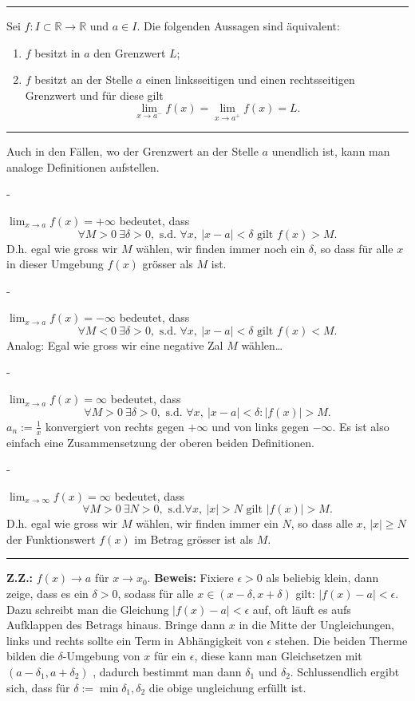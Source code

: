 \documentclass[a4paper,landscape,8pt]{extarticle}
\newcommand{\R}{\mathbb{R}}
\newcommand{\abs}[1]{\left\lvert #1 \right\rvert}
\newcommand{\sep}{\vspace{5pt}\noindent\hrule\vspace{5pt}}
\newcommand{\ZZ}{\textbf{Z.Z.: }}
\newcommand{\Beweis}{\textbf{Beweis: }}
\begin{document}
\begin{multicols*}{4}
\sep

\Satz Sei $f\colon I\subset\R\to\R$ und $a\in I$. Die folgenden Aussagen sind
äquivalent:
\begin{enumerate}[label=\roman*)]
  \item $f$ besitzt in $a$ den Grenzwert $L$;
  \item $f$ besitzt an der Stelle $a$ einen linksseitigen und einen
  rechtsseitigen Grenzwert und für diese gilt
  \[
  \lim_{x\to a^-} f(x) = \lim_{x\to a^+} f(x) = L.
  \]
\end{enumerate}

\sep

Auch in den Fällen, wo der Grenzwert an der Stelle $a$ unendlich ist, kann man
analoge Definitionen aufstellen.

-

\Def $\lim_{x\to a} f(x)= + \infty$ bedeutet, dass
\[
\forall M>0 \ \exists\delta > 0, \text{ s.d. } \forall x, \ \abs{x-a}<\delta
\text{ gilt } f(x) > M. 
\]
D.h. egal wie gross wir $M$ wählen, wir finden immer noch ein $\delta$, so dass
für alle $x$ in dieser Umgebung $f(x)$ grösser als $M$ ist.

-

\Def $\lim_{x\to a} f(x)= - \infty$ bedeutet, dass
\[
\forall M<0 \ \exists\delta > 0, \text{ s.d. } \forall x, \ \abs{x-a}<\delta
\text{ gilt } f(x) < M. 
\]
Analog: Egal wie gross wir eine negative Zal $M$ wählen\ldots

-

\Def $\lim_{x\to a} f(x)= \infty$ bedeutet, dass
\[
\forall M>0 \ \exists\delta > 0, \text{ s.d. } \forall x, \ \abs{x-a}<\delta
\colon \abs{f(x)} > M. 
\]
\Bsp $a_n:=\frac{1}{x}$ konvergiert von rechts gegen $+\infty$ und von links
gegen $-\infty$. Es ist also einfach eine Zusammensetzung der oberen beiden
Definitionen.

-

\Def $\lim_{x\to \infty} f(x)= \infty$ bedeutet, dass
\[
\forall M>0 \ \exists N > 0, \text{ s.d.} \forall x, \ \abs{x}>N
\text{ gilt } \abs{f(x)} > M. 
\]
D.h. egal wie gross wir $M$ wählen, wir finden immer ein $N$, so dass alle $x$,
$\abs{x}\geq N$ der Funktionswert $f(x)$ im Betrag grösser ist als $M$.

\sep


\ZZ $f(x)\to a$ für $x\to x_0$. \Beweis Fixiere $\epsilon >0$ als beliebig
klein, dann zeige, dass es ein $\delta > 0$, sodass für alle
$x\in(x-\delta,x+\delta)$ gilt:
$\abs{f(x)-a}<\epsilon$. Dazu schreibt man die Gleichung $\abs{f(x)-a}<\epsilon$
auf, oft läuft es aufs Aufklappen des Betrags hinaus.
Bringe dann $x$ in die Mitte der Ungleichungen, links und rechts sollte ein Term
in Abhängigkeit von $\epsilon$ stehen. Die beiden Therme bilden die
$\delta$-Umgebung von $x$ für ein $\epsilon$, diese kann man Gleichsetzen mit
$(a-\delta_1, a+\delta_2)$ , dadurch bestimmt man dann $\delta_1$ und
$\delta_2$. Schlussendlich ergibt sich, dass für $\delta:=\min{\delta_1,
\delta_2}$ die obige ungleichung erfüllt ist.


\end{multicols*}
\end{document}
